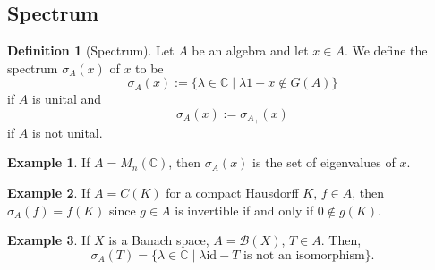 \documentclass[]{article}
\theoremstyle{definition}
\newtheorem{definition}{Definition}[section]
\newtheorem{example}{Example}[section]
\begin{document}
\subsection{Spectrum} 

\begin{definition}[Spectrum]
  Let \(A\) be an algebra and let \(x \in A\). We define the spectrum \(\sigma_A(x)\) of \(x\) to be
  \[\sigma_A(x) := \{\lambda \in \mathbb{C} \mid \lambda 1 - x \not\in G(A)\}\]
  if \(A\) is unital and 
  \[\sigma_A(x) := \sigma_{A_+}(x)\]
  if \(A\) is not unital.
\end{definition}

\begin{example}
  If \(A = M_n(\mathbb{C})\), then \(\sigma_A(x)\) is the set of eigenvalues of \(x\).
\end{example}

\begin{example}
  If \(A = C(K)\) for a compact Hausdorff \(K\), \(f \in A\), then \(\sigma_A(f) = f(K)\) since 
  \(g \in A\) is invertible if and only if \(0 \not\in g(K)\).
\end{example}

\begin{example}
  If \(X\) is a Banach space, \(A = \mathcal{B}(X)\), \(T \in A\). Then, 
  \[\sigma_A(T) = \{\lambda \in \mathbb{C} \mid \lambda \text{id} - T \text{ is not an isomorphism}\}.\]
\end{example}
\end{document}
